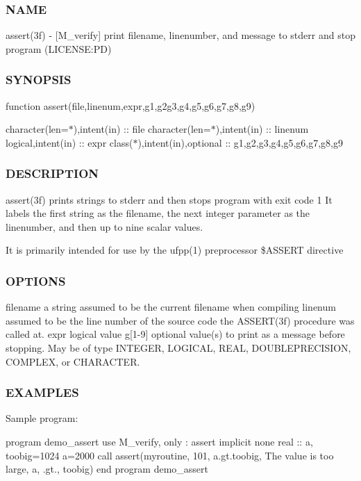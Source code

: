 \subsubsection*{N\+A\+ME}

assert(3f) -\/ \mbox{[}M\+\_\+verify\mbox{]} print filename, linenumber, and message to stderr and stop program (L\+I\+C\+E\+N\+SE\+:PD) \subsubsection*{S\+Y\+N\+O\+P\+S\+IS}

function assert(file,linenum,expr,g1,g2g3,g4,g5,g6,g7,g8,g9)

character(len=$\ast$),intent(in) \+:\+: file character(len=$\ast$),intent(in) \+:\+: linenum logical,intent(in) \+:\+: expr class($\ast$),intent(in),optional \+:\+: g1,g2,g3,g4,g5,g6,g7,g8,g9 \subsubsection*{D\+E\+S\+C\+R\+I\+P\+T\+I\+ON}

assert(3f) prints strings to stderr and then stops program with exit code 1 It labels the first string as the filename, the next integer parameter as the linenumber, and then up to nine scalar values.

It is primarily intended for use by the ufpp(1) preprocessor \$\+A\+S\+S\+E\+RT directive

\subsubsection*{O\+P\+T\+I\+O\+NS}

\begin{DoxyVerb}filename   a string assumed to be the current filename when compiling
linenum    assumed to be the line number of the source code the ASSERT(3f)
           procedure was called at.
expr       logical value
g[1-9]  optional value(s) to print as a message before stopping. May
        be of type INTEGER, LOGICAL, REAL, DOUBLEPRECISION, COMPLEX,
        or CHARACTER.
\end{DoxyVerb}


\subsubsection*{E\+X\+A\+M\+P\+L\+ES}

Sample program\+:

program demo\+\_\+assert use M\+\_\+verify, only \+: assert implicit none real \+:\+: a, toobig=1024 a=2000 call assert(\textquotesingle{}myroutine\textquotesingle{}, 101, a.\+gt.\+toobig, \textquotesingle{}The value is too large\textquotesingle{}, a, \textquotesingle{}.gt.\textquotesingle{}, toobig) end program demo\+\_\+assert

